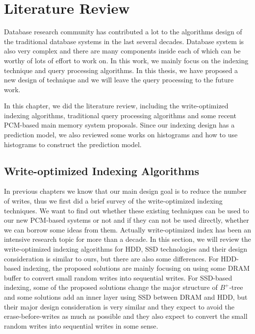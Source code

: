 \chapter{Literature Review}
\label{sec:rw}

Database research community has contributed a lot to the algorithms design of the traditional database systems in the last several decades. Database system is also very complex and there are many components inside each of which can be worthy of lots of effort to work on. In this work, we mainly focus on the indexing technique and query processing algorithms. In this thesis, we have proposed a new design of \bplustree technique and we will leave the query processing to the future work.

In this chapter, we did the literature review, including the write-optimized indexing algorithms, traditional query processing algorithms and some recent PCM-based main memory system proposals. Since our indexing design has a prediction model, we also reviewed some works on histograms and how to use histograms to construct the prediction model.

\section{Write-optimized Indexing Algorithms}
In previous chapters we know that our main design goal is to reduce the number of writes, thus we first did a brief survey of the write-optimized indexing techniques. We want to find out whether these existing techniques can be used to our new PCM-based systems or not and if they can not be used directly, whether we can borrow some ideas from them.
Actually write-optimized \bplustree index has been an intensive research topic for
more than a decade. In this section, we will review the write-optimized indexing algorithms for HDD, SSD technologies and their design consideration is similar to ours, but there are also some differences. For HDD-based indexing, the proposed solutions are mainly focusing on
using some DRAM buffer to convert small random writes into sequential writes. For SSD-based indexing, some of the proposed solutions change the
major structure of $B^+$-tree and some solutions add an inner layer using SSD between DRAM and HDD, but their major design consideration is very similar and they expect to avoid the erase-before-writes as much as possible and they also expect to convert the small random writes into sequential writes in some sense.

